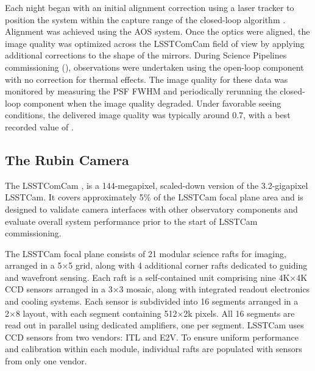 Each night began with an initial alignment correction using a laser tracker to position the system within the capture range of the closed-loop \gls{algorithm} \citep{10.1117/12.3019031}.
Alignment was achieved using the \gls{AOS} system.
Once the optics were aligned, the image quality was optimized across the \gls{LSSTComCam} field of view by applying additional corrections to the shape of the mirrors.
During \gls{Science Pipelines} commissioning (), observations were undertaken using the open-loop component with no correction for thermal effects.
The image quality for these data was monitored by measuring the \gls{PSF} \gls{FWHM} and periodically rerunning the closed-loop component when the image quality degraded.
Under favorable \gls{seeing} conditions, the delivered image quality was typically around {0.7\arcsec\xspace}, with a best
recorded value of \bestimagequality.

\subsection{The Rubin Camera
\label{ssec:comcam}}
The \gls{LSSTComCam} \citep{10.71929/rubin/2561361,2022SPIE12184E..0JS,2020SPIE11447E..0LS,2018SPIE10700E..3DH}, is a 144-megapixel, scaled-down version of the 3.2-gigapixel \gls{LSSTCam}.
It covers approximately 5\% of the \gls{LSSTCam} focal plane area and is designed to validate camera interfaces with other observatory components and evaluate overall system performance prior to the start of \gls{LSSTCam} commissioning.

The \gls{LSSTCam} focal plane consists of 21 modular science rafts for imaging, arranged in a 5×5 grid, along with 4 additional corner rafts dedicated to guiding and wavefront sensing.
Each raft is a self-contained unit comprising nine 4K×4K \gls{CCD} sensors arranged in a 3×3 mosaic, along with integrated readout electronics and cooling systems.
Each sensor is subdivided into 16 segments arranged in a 2×8 layout, with each segment containing 512×2k pixels.
All 16 segments are read out in parallel using dedicated amplifiers, one per segment.
\gls{LSSTCam} uses \gls{CCD} sensors from two vendors: \gls{ITL} and \gls{E2V}.
To ensure uniform performance and \gls{calibration} within each module, individual rafts are populated with sensors from only one vendor.

